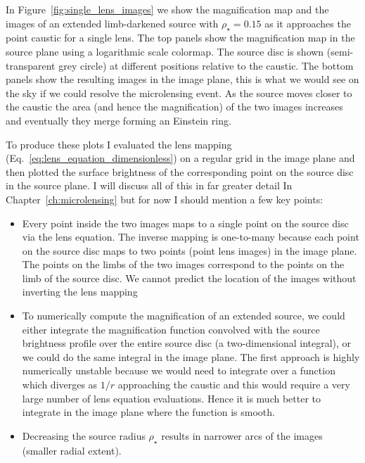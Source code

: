 \documentclass[11pt]{report}
\begin{document}
In Figure~\ref{fig:single_lens_images} we show the magnification map and the
images of an extended limb-darkened source with $\rho_\star=0.15$ as it
approaches the point caustic for a single lens. The top panels show the
magnification map in the source plane using a logarithmic scale colormap. The
source disc is shown (semi-transparent grey circle) at different positions
relative to the caustic. The bottom panels show the resulting images in the
image plane, this is what we would see on the sky if we could resolve the
microlensing event. As the source moves closer to the caustic the area (and
hence the magnification) of the two images increases and eventually they merge
forming an Einstein ring.

To produce these plots I evaluated the lens mapping
(Eq.~\ref{eq:lens_equation_dimensionless}) on a regular grid in the image plane
and then plotted the surface brightness of the corresponding point on the
source disc in the source plane. I will discuss all of this in far greater
detail In Chapter~\ref{ch:microlensing} but for now I should mention a few key
points:
\begin{itemize}
    \item Every point inside the two images maps to a single point on the source disc via
          the lens equation. The inverse mapping is one-to-many because each point on the
          source disc maps to two points (point lens images) in the image plane. The
          points on the limbs of the two images correspond to the points on the limb of
          the source disc. We cannot predict the location of the images without inverting
          the lens mapping
    \item To numerically compute the magnification of an extended source, we could either
          integrate the magnification function convolved with the source brightness
          profile over the entire source disc (a two-dimensional integral), or we could
          do the same integral in the image plane. The first approach is highly
          numerically unstable because we would need to integrate over a function which
          diverges as $1/r$ approaching the caustic and this would require a very large
          number of lens equation evaluations. Hence it is much better to integrate in
          the image plane where the function is smooth.
    \item Decreasing the source radius $\rho_\star$ results in narrower arcs of the
          images (smaller radial extent).
\end{itemize}
\end{document}
